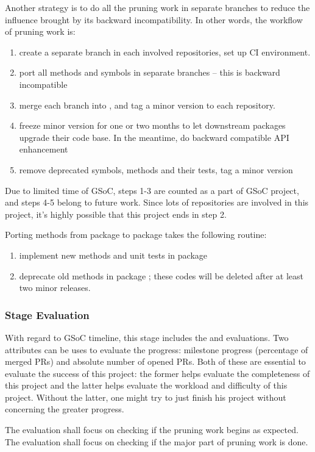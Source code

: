 \newcommand{\packageA}{package \sname{A}\xspace}
\newcommand{\packageB}{package \sname{B}\xspace}
Another strategy is to do all the pruning work in separate branches to reduce the influence brought by its backward incompatibility. In other words, the workflow of pruning work is:
\begin{enumerate}
    \item create a separate branch  in each involved repositories, set up CI environment.
    \item port all methods and symbols in separate branches -- this is backward incompatible
    \item merge each branch into , and tag a minor version to each repository.
    \item freeze minor version for one or two months to let downstream packages upgrade their code base. In the meantime, do backward compatible API enhancement
    \item remove deprecated symbols, methods and their tests, tag a minor version
\end{enumerate}
Due to limited time of GSoC, steps 1-3 are counted as a part of GSoC project, and steps 4-5 belong to future work. Since lots of repositories are involved in this project, it's highly possible that this project ends in step 2.\par

Porting methods from \packageA to \packageB takes the following routine:
\begin{enumerate}
    \item implement new methods and unit tests in \packageB
    \item deprecate old methods in \packageA; these codes will be deleted after at least two minor releases.
\end{enumerate}

\subsubsection*{Stage Evaluation}

With regard to GSoC timeline, this stage includes the  and  evaluations. Two attributes can be uses to evaluate the progress: milestone progress (percentage of merged PRs) and absolute number of opened PRs. Both of these are essential to evaluate the success of this project: the former helps evaluate the completeness of this project and the latter helps evaluate the workload and difficulty of this project. Without the latter, one might try to just finish his project without concerning the greater \images{}  progress. \par

The  evaluation shall focus on checking if the pruning work begins as expected. The  evaluation shall focus on checking if the major part of pruning work is done.
